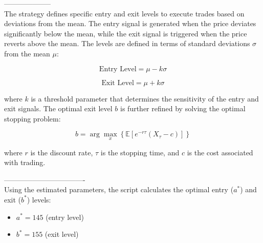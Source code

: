 \documentclass{article}
\begin{document}
--------------------\\
The strategy defines specific entry and exit levels to execute trades based on deviations from the mean. The entry signal is generated when the price deviates significantly below the mean, while the exit signal is triggered when the price reverts above the mean. The levels are defined in terms of standard deviations \( \sigma \) from the mean \( \mu \):

\begin{equation}
\text{Entry Level} = \mu - k \sigma
\end{equation}

\begin{equation}
\text{Exit Level} = \mu + k \sigma
\end{equation}

where \( k \) is a threshold parameter that determines the sensitivity of the entry and exit signals. The optimal exit level \( b \) is further refined by solving the optimal stopping problem:

\begin{equation}
b = \arg \max_x \left\{ \mathbb{E} \left[ e^{-r \tau} (X_\tau - c) \right] \right\}
\end{equation}

where \( r \) is the discount rate, \( \tau \) is the stopping time, and \( c \) is the cost associated with trading.

----------------------------------\\

Using the estimated parameters, the script calculates the optimal entry ($a^*$) and exit ($b^*$) levels:

\begin{itemize}
    \item $a^* = 145$ \quad (entry level)
    \item $b^* = 155$ \quad (exit level)
\end{itemize}
\end{document}
